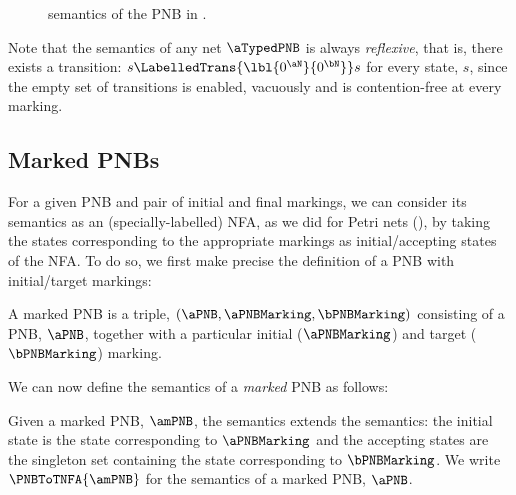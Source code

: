 \begin{figure}[ht]
\centering
{}
\caption{ semantics of the PNB in . }
\label{fig:componentBLTS}
\end{figure}

Note that the \TLTS{} semantics of any net $\aTypedPNB$ is always
\emph{reflexive}, that is, there exists a transition: $s
\LabelledTrans{\lbl{0^\aN}{0^\bN}} s$ for every state, $s$, since the empty set
of transitions is enabled, vacuously and is contention-free at every marking.

\subsection{Marked PNBs}\label{sec:markedPNB}

For a given PNB and pair of initial and final markings, we can
consider its \TLTS{} semantics as an (specially-labelled) NFA, as we did
for Petri nets (), by taking the
states corresponding to the appropriate markings as initial/accepting states of
the NFA. To do so, we first make precise the definition of a PNB with
initial/target markings:

\begin{definition}
    A marked PNB is a triple, $(\aPNB, \aPNBMarking, \bPNBMarking)$ consisting
    of a PNB, $\aPNB$, together with a particular initial ($\aPNBMarking$) and
    target ($\bPNBMarking$) marking.
\end{definition}

We can now define the \TNFA{} semantics of a \emph{marked} PNB as follows:

\begin{definition}\label{defn:PNBTNFA}
    Given a marked PNB, $\amPNB$, the \TNFA{} semantics extends the \TLTS{}
    semantics: the initial state is the state corresponding to $\aPNBMarking$
    and the accepting states are the singleton set containing the state
    corresponding to $\bPNBMarking$. We write $\PNBToTNFA{\amPNB}$ for the
    \TNFA{} semantics of a marked PNB, $\aPNB$.
\end{definition}

